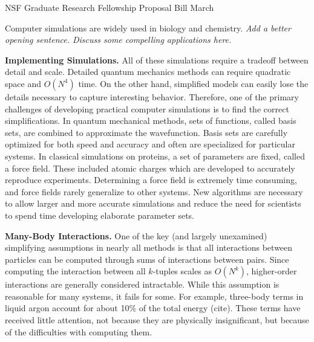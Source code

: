 \documentclass[twoside,leqno, 12pt]{article}
\date{}
\begin{document}
\begin{center}
\LARGE{NSF Graduate Research Fellowship Proposal} \newline
\Large{Bill March}
\end{center}



Computer simulations are widely used in biology and chemistry.  \textit{Add a better opening sentence.  Discuss some compelling applications here.}

\textbf{Implementing Simulations.}  All of these simulations require a tradeoff between detail and scale.  Detailed quantum mechanics methods can require quadratic space and $O(N^4)$ time.  On the other hand, simplified models can easily lose the details necessary to capture interesting behavior.  Therefore, one of the primary challenges of developing practical computer simulations is to find the correct simplifications.  In quantum mechanical methods, sets of functions, called basis sets, are combined to approximate the wavefunction.  Basis sets are carefully optimized for both speed and accuracy and often are specialized for particular systems.  In classical simulations on proteins, a set of parameters are fixed, called a force field.  These included atomic charges which are developed to accurately reproduce experiments.  Determining a force field is extremely time consuming, and force fields rarely generalize to other systems.  New algorithms are necessary to allow larger and more accurate simulations and reduce the need for scientists to spend time developing elaborate parameter sets.  

\textbf{Many-Body Interactions.}  One of the key (and largely unexamined) simplifying assumptions in nearly all methods is that all interactions between particles can be computed through sums of interactions between pairs.  Since computing the interaction between all $k$-tuples scales as $O(N^k)$, higher-order interactions are generally considered intractable.  While this assumption is reasonable for many systems, it fails for some.  For example, three-body terms in liquid argon account for about 10\% of the total energy (cite).  These terms have received little attention, not because they are physically insignificant, but because of the difficulties with computing them.
\end{document}
